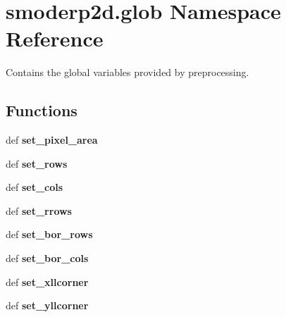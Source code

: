 \hypertarget{namespacesmoderp2d_1_1glob}{\section{smoderp2d.\-glob Namespace Reference}
\label{namespacesmoderp2d_1_1glob}
}


Contains the global variables provided by preprocessing.  


\subsection*{Functions}
\begin{DoxyCompactItemize}
\item 
\hypertarget{namespacesmoderp2d_1_1glob_a7d721581480e83655c2380adb07b1d28}{def {\bfseries set\-\_\-pixel\-\_\-area}}\label{namespacesmoderp2d_1_1glob_a7d721581480e83655c2380adb07b1d28}

\item 
\hypertarget{namespacesmoderp2d_1_1glob_a3c5e0d8586d5699dc05607da7222e98c}{def {\bfseries set\-\_\-rows}}\label{namespacesmoderp2d_1_1glob_a3c5e0d8586d5699dc05607da7222e98c}

\item 
\hypertarget{namespacesmoderp2d_1_1glob_ae51ac2e536c455bbc6a275780f985f38}{def {\bfseries set\-\_\-cols}}\label{namespacesmoderp2d_1_1glob_ae51ac2e536c455bbc6a275780f985f38}

\item 
\hypertarget{namespacesmoderp2d_1_1glob_a5ebc7f8e972b7a2f544815306184135f}{def {\bfseries set\-\_\-rrows}}\label{namespacesmoderp2d_1_1glob_a5ebc7f8e972b7a2f544815306184135f}

\item 
\hypertarget{namespacesmoderp2d_1_1glob_aab097b15a2847842c4c58815645ebf5c}{def {\bfseries set\-\_\-bor\-\_\-rows}}\label{namespacesmoderp2d_1_1glob_aab097b15a2847842c4c58815645ebf5c}

\item 
\hypertarget{namespacesmoderp2d_1_1glob_a0fec017a209803668eae4d9d201f2a0a}{def {\bfseries set\-\_\-bor\-\_\-cols}}\label{namespacesmoderp2d_1_1glob_a0fec017a209803668eae4d9d201f2a0a}

\item 
\hypertarget{namespacesmoderp2d_1_1glob_a55fc8fbe475752ed274cc3657a85b671}{def {\bfseries set\-\_\-xllcorner}}\label{namespacesmoderp2d_1_1glob_a55fc8fbe475752ed274cc3657a85b671}

\item 
\hypertarget{namespacesmoderp2d_1_1glob_ae6d0fac5560f1db60b0f0d298697c060}{def {\bfseries set\-\_\-yllcorner}}\label{namespacesmoderp2d_1_1glob_ae6d0fac5560f1db60b0f0d298697c060}


\end{DoxyCompactItemize}
